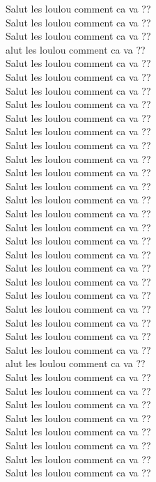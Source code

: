 Salut les loulou comment ca va ??\\
Salut les loulou comment ca va ??\\
Salut les loulou comment ca va ??\\alut les loulou comment ca va ??\\
Salut les loulou comment ca va ??\\
Salut les loulou comment ca va ??\\
Salut les loulou comment ca va ??\\
Salut les loulou comment ca va ??\\
Salut les loulou comment ca va ??\\
Salut les loulou comment ca va ??\\
Salut les loulou comment ca va ??\\
Salut les loulou comment ca va ??\\
Salut les loulou comment ca va ??\\
Salut les loulou comment ca va ??\\
Salut les loulou comment ca va ??\\
Salut les loulou comment ca va ??\\
Salut les loulou comment ca va ??\\
Salut les loulou comment ca va ??\\
Salut les loulou comment ca va ??\\
Salut les loulou comment ca va ??\\
Salut les loulou comment ca va ??\\
Salut les loulou comment ca va ??\\
Salut les loulou comment ca va ??\\
Salut les loulou comment ca va ??\\
Salut les loulou comment ca va ??\\
Salut les loulou comment ca va ??\\alut les loulou comment ca va ??\\
Salut les loulou comment ca va ??\\
Salut les loulou comment ca va ??\\
Salut les loulou comment ca va ??\\
Salut les loulou comment ca va ??\\
Salut les loulou comment ca va ??\\
Salut les loulou comment ca va ??\\
Salut les loulou comment ca va ??\\
Salut les loulou comment ca va ??\\
